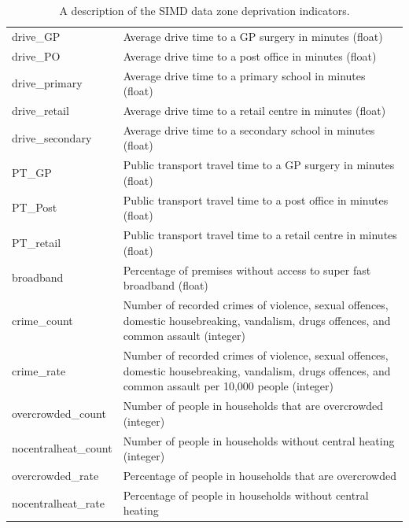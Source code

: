 \documentclass{thesis}
\begin{document}
\begin{table}[ht!]
\begin{tabular}{||l p{100mm}||}
     drive\_GP & Average drive time to a GP surgery in minutes (float) \\
     drive\_PO & Average drive time to a post office in minutes (float) \\
     drive\_primary & Average drive time to a primary school in minutes (float) \\
     drive\_retail & Average drive time to a retail centre in minutes (float) \\
     drive\_secondary & Average drive time to a secondary school in minutes (float) \\
     PT\_GP & Public transport travel time to a GP surgery in minutes (float) \\
     PT\_Post & Public transport travel time to a post office in minutes (float) \\
     PT\_retail & Public transport travel time to a retail centre in minutes (float) \\
     broadband & Percentage of premises without access to super fast broadband (float) \\
     crime\_count & Number of recorded crimes of violence, sexual offences, domestic housebreaking, vandalism, drugs offences, and common assault (integer) \\
     crime\_rate & Number of recorded crimes of violence, sexual offences, domestic housebreaking, vandalism, drugs offences, and common assault per 10,000 people (integer) \\
     overcrowded\_count & Number of people in households that are overcrowded (integer) \\
     nocentralheat\_count & Number of people in households without central heating (integer) \\
     overcrowded\_rate & Percentage of people in households that are overcrowded \\
     nocentralheat\_rate & Percentage of people in households without central heating \\ [1ex] 
     \hline
    \end{tabular}
    \hspace{100mm}
    \caption{A description of the SIMD data zone deprivation indicators.}
    \label{table:simd-deprivation-indicators}
\end{table}
\end{document}

